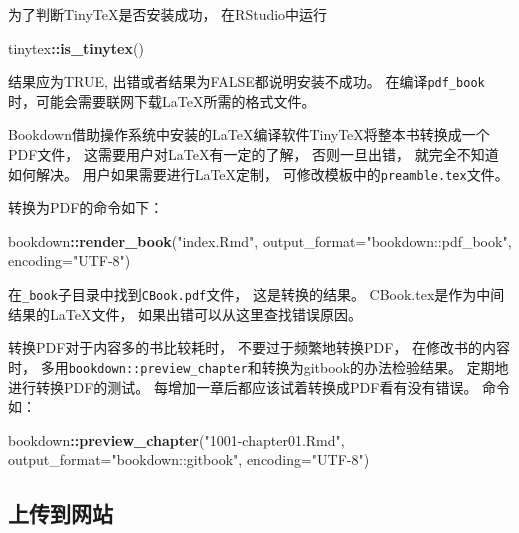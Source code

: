 \documentclass[]{book}
\newenvironment{Shaded}{\begin{snugshade}}{\end{snugshade}}
\newcommand{\DataTypeTok}[1]{\textcolor[rgb]{0.13,0.29,0.53}{#1}}
\newcommand{\KeywordTok}[1]{\textcolor[rgb]{0.13,0.29,0.53}{\textbf{#1}}}
\newcommand{\NormalTok}[1]{#1}
\newcommand{\OperatorTok}[1]{\textcolor[rgb]{0.81,0.36,0.00}{\textbf{#1}}}
\newcommand{\StringTok}[1]{\textcolor[rgb]{0.31,0.60,0.02}{#1}}
\theoremstyle{definition}
\theoremstyle{definition}
\theoremstyle{definition}
\theoremstyle{remark}
\begin{document}
为了判断TinyTeX是否安装成功， 在RStudio中运行

\begin{Shaded}
\begin{Highlighting}[]
\NormalTok{tinytex}\OperatorTok{::}\KeywordTok{is_tinytex}\NormalTok{()}
\end{Highlighting}
\end{Shaded}

结果应为TRUE, 出错或者结果为FALSE都说明安装不成功。
在编译\texttt{pdf\_book}时，可能会需要联网下载LaTeX所需的格式文件。

Bookdown借助操作系统中安装的LaTeX编译软件TinyTeX将整本书转换成一个PDF文件，
这需要用户对LaTeX有一定的了解， 否则一旦出错， 就完全不知道如何解决。
用户如果需要进行LaTeX定制， 可修改模板中的\texttt{preamble.tex}文件。

转换为PDF的命令如下：

\begin{Shaded}
\begin{Highlighting}[]
\NormalTok{bookdown}\OperatorTok{::}\KeywordTok{render_book}\NormalTok{(}\StringTok{"index.Rmd"}\NormalTok{, }
  \DataTypeTok{output_format=}\StringTok{"bookdown::pdf_book"}\NormalTok{, }\DataTypeTok{encoding=}\StringTok{"UTF-8"}\NormalTok{)}
\end{Highlighting}
\end{Shaded}

在\texttt{\_book}子目录中找到\texttt{CBook.pdf}文件， 这是转换的结果。
CBook.tex是作为中间结果的LaTeX文件， 如果出错可以从这里查找错误原因。

转换PDF对于内容多的书比较耗时， 不要过于频繁地转换PDF，
在修改书的内容时，
多用\texttt{bookdown::preview\_chapter}和转换为gitbook的办法检验结果。
定期地进行转换PDF的测试。 每增加一章后都应该试着转换成PDF看有没有错误。
命令如：

\begin{Shaded}
\begin{Highlighting}[]
\NormalTok{bookdown}\OperatorTok{::}\KeywordTok{preview_chapter}\NormalTok{(}\StringTok{"1001-chapter01.Rmd"}\NormalTok{, }
  \DataTypeTok{output_format=}\StringTok{"bookdown::gitbook"}\NormalTok{, }\DataTypeTok{encoding=}\StringTok{"UTF-8"}\NormalTok{)}
\end{Highlighting}
\end{Shaded}

\hypertarget{usage-website}{%
\subsection{上传到网站}\label{usage-website}}
\end{document}
